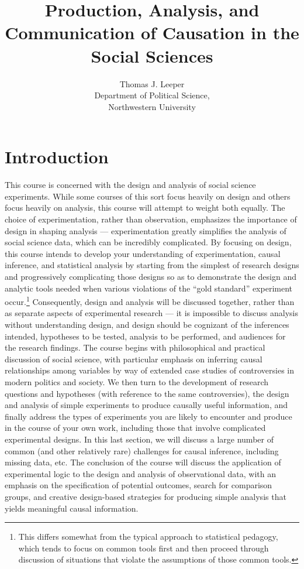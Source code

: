 \documentclass[12pt]{article}
\title{Production, Analysis, and Communication of Causation in the Social Sciences}
\author{Thomas J. Leeper\\
Department of Political Science,\\
Northwestern University}
\begin{document}
\maketitle

\section{Introduction}
This course is concerned with the design and analysis of social science experiments. While some courses of this sort focus heavily on design and others focus heavily on analysis, this course will attempt to weight both equally. The choice of experimentation, rather than observation, emphasizes the importance of design in shaping analysis --- experimentation greatly simplifies the analysis of social science data, which can be incredibly complicated. By focusing on design, this course intends to develop your understanding of experimentation, causal inference, and statistical analysis by starting from the simplest of research designs and progressively complicating those designs so as to demonstrate the design and analytic tools needed when various violations of the ``gold standard'' experiment occur.\footnote{This differs somewhat from the typical approach to statistical pedagogy, which tends to focus on common tools first and then proceed through discussion of situations that violate the assumptions of those common tools.} Consequently, design and analysis will be discussed together, rather than as separate aspects of experimental research --- it is impossible to discuss analysis without understanding design, and design should be cognizant of the inferences intended, hypotheses to be tested, analysis to be performed, and audiences for the research findings. The course begins with philosophical and practical discussion of social science, with particular emphasis on inferring causal relationships among variables by way of extended case studies of controversies in modern politics and society. We then turn to the development of research questions and hypotheses (with reference to the same controversies), the design and analysis of simple experiments to produce causally useful information, and finally address the types of experiments you are likely to encounter and produce in the course of your own work, including those that involve complicated experimental designs. In this last section, we will discuss a large number of common (and other relatively rare) challenges for causal inference, including missing data, etc. The conclusion of the course will discuss the application of experimental logic to the design and analysis of observational data, with an emphasis on the specification of potential outcomes, search for comparison groups, and creative design-based strategies for producing simple analysis that yields meaningful causal information. 
\end{document}

